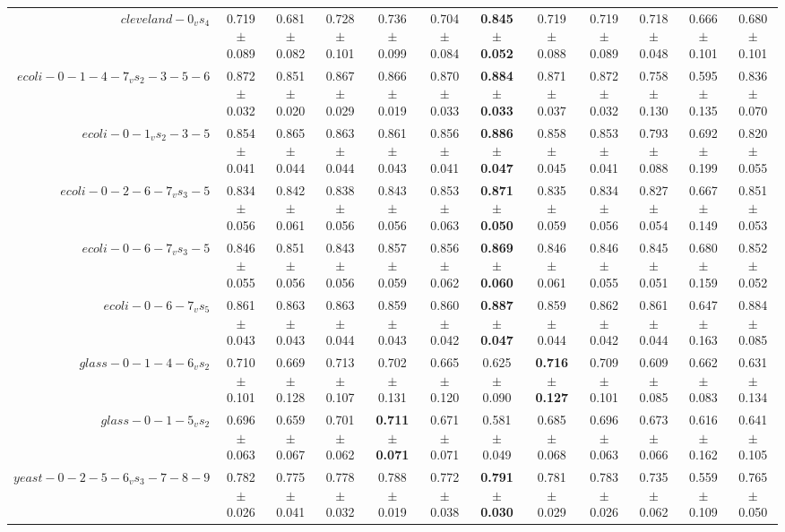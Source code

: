\begin{table}[!ht]
{\begin{tabular}{r c c c c c c c c c c c}
$cleveland-0_vs_4$ & 0.719 $\pm$ 0.089 & 0.681 $\pm$ 0.082 & 0.728 $\pm$ 0.101 & 0.736 $\pm$ 0.099 & 0.704 $\pm$ 0.084 & \textbf{0.845 $\pm$ 0.052} & 0.719 $\pm$ 0.088 & 0.719 $\pm$ 0.089 & 0.718 $\pm$ 0.048 & 0.666 $\pm$ 0.101 & 0.680 $\pm$ 0.101 \\
$ecoli-0-1-4-7_vs_2-3-5-6$ & 0.872 $\pm$ 0.032 & 0.851 $\pm$ 0.020 & 0.867 $\pm$ 0.029 & 0.866 $\pm$ 0.019 & 0.870 $\pm$ 0.033 & \textbf{0.884 $\pm$ 0.033} & 0.871 $\pm$ 0.037 & 0.872 $\pm$ 0.032 & 0.758 $\pm$ 0.130 & 0.595 $\pm$ 0.135 & 0.836 $\pm$ 0.070 \\
$ecoli-0-1_vs_2-3-5$ & 0.854 $\pm$ 0.041 & 0.865 $\pm$ 0.044 & 0.863 $\pm$ 0.044 & 0.861 $\pm$ 0.043 & 0.856 $\pm$ 0.041 & \textbf{0.886 $\pm$ 0.047} & 0.858 $\pm$ 0.045 & 0.853 $\pm$ 0.041 & 0.793 $\pm$ 0.088 & 0.692 $\pm$ 0.199 & 0.820 $\pm$ 0.055 \\
$ecoli-0-2-6-7_vs_3-5$ & 0.834 $\pm$ 0.056 & 0.842 $\pm$ 0.061 & 0.838 $\pm$ 0.056 & 0.843 $\pm$ 0.056 & 0.853 $\pm$ 0.063 & \textbf{0.871 $\pm$ 0.050} & 0.835 $\pm$ 0.059 & 0.834 $\pm$ 0.056 & 0.827 $\pm$ 0.054 & 0.667 $\pm$ 0.149 & 0.851 $\pm$ 0.053 \\
$ecoli-0-6-7_vs_3-5$ & 0.846 $\pm$ 0.055 & 0.851 $\pm$ 0.056 & 0.843 $\pm$ 0.056 & 0.857 $\pm$ 0.059 & 0.856 $\pm$ 0.062 & \textbf{0.869 $\pm$ 0.060} & 0.846 $\pm$ 0.061 & 0.846 $\pm$ 0.055 & 0.845 $\pm$ 0.051 & 0.680 $\pm$ 0.159 & 0.852 $\pm$ 0.052 \\
$ecoli-0-6-7_vs_5$ & 0.861 $\pm$ 0.043 & 0.863 $\pm$ 0.043 & 0.863 $\pm$ 0.044 & 0.859 $\pm$ 0.043 & 0.860 $\pm$ 0.042 & \textbf{0.887 $\pm$ 0.047} & 0.859 $\pm$ 0.044 & 0.862 $\pm$ 0.042 & 0.861 $\pm$ 0.044 & 0.647 $\pm$ 0.163 & 0.884 $\pm$ 0.085 \\
$glass-0-1-4-6_vs_2$ & 0.710 $\pm$ 0.101 & 0.669 $\pm$ 0.128 & 0.713 $\pm$ 0.107 & 0.702 $\pm$ 0.131 & 0.665 $\pm$ 0.120 & 0.625 $\pm$ 0.090 & \textbf{0.716 $\pm$ 0.127} & 0.709 $\pm$ 0.101 & 0.609 $\pm$ 0.085 & 0.662 $\pm$ 0.083 & 0.631 $\pm$ 0.134 \\
$glass-0-1-5_vs_2$ & 0.696 $\pm$ 0.063 & 0.659 $\pm$ 0.067 & 0.701 $\pm$ 0.062 & \textbf{0.711 $\pm$ 0.071} & 0.671 $\pm$ 0.071 & 0.581 $\pm$ 0.049 & 0.685 $\pm$ 0.068 & 0.696 $\pm$ 0.063 & 0.673 $\pm$ 0.066 & 0.616 $\pm$ 0.162 & 0.641 $\pm$ 0.105 \\
$yeast-0-2-5-6_vs_3-7-8-9$ & 0.782 $\pm$ 0.026 & 0.775 $\pm$ 0.041 & 0.778 $\pm$ 0.032 & 0.788 $\pm$ 0.019 & 0.772 $\pm$ 0.038 & \textbf{0.791 $\pm$ 0.030} & 0.781 $\pm$ 0.029 & 0.783 $\pm$ 0.026 & 0.735 $\pm$ 0.062 & 0.559 $\pm$ 0.109 & 0.765 $\pm$ 0.050 \\

\end{tabular}}
\end{table}
